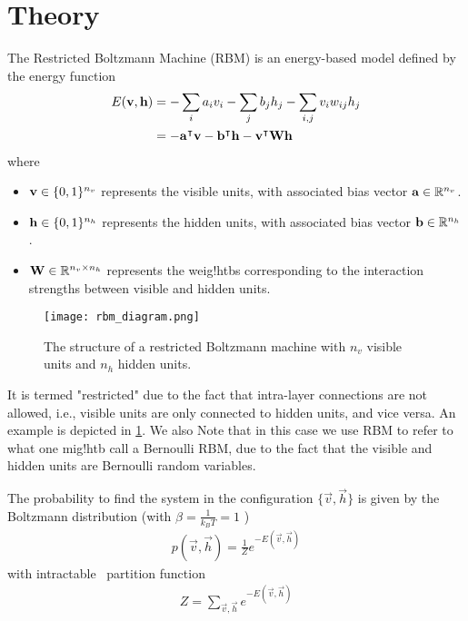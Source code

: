 \section{Theory}
The Restricted Boltzmann Machine (RBM) is an energy-based model defined by the energy function
\begin{align}
    E(\mathbf{v}, \mathbf{h})
        &= -\sum_i a_i v_i - \sum_j b_j h_j - \sum_{i,j} v_i w_{ij} h_j \label{eq:rbm_energy} \\
        &= -\mathbf{a}^\intercal\mathbf{v} - \mathbf{b}^\intercal\mathbf{h} - \mathbf{v}^\intercal\mathbf{W}\mathbf{h} \label{eq:rbm_energy_vectorized}
\end{align}
where
\begin{itemize}
    \item \( \mathbf{v} \in \{0,1\}^{n_v} \) represents the visible units, with associated bias vector \( \mathbf{a} \in \mathbb{R}^{n_v} \).
    \item \( \mathbf{h} \in \{0,1\}^{n_h} \) represents the hidden units, with associated bias vector \( \mathbf{b} \in \mathbb{R}^{n_h} \).
    \item \( \mathbf{W} \in \mathbb{R}^{n_v \times n_h} \) represents the weig!htbs corresponding to the interaction strengths between visible and hidden units.
\end{itemize}

\begin{figure}[!htb]
    \begin{center}
        \texttt{[image: rbm\_diagram.png]}
    \end{center}
    \caption{The structure of a restricted Boltzmann machine with \( n_v \) visible units and \( n_h \) hidden units.}
    \label{fig:rbm_diagram}
\end{figure}

It is termed "restricted" due to the fact that intra-layer connections are not allowed, i.e., visible units are only connected to hidden units, and vice versa.
An example is depicted in \cref{fig:rbm_diagram}.
We also Note that in this case we use RBM to refer to what one mig!htb call a Bernoulli RBM, due to the fact that the visible and hidden units are Bernoulli random variables.

The probability to find the system in the configuration \( \{\vec{v},\vec{h}\} \) is given by the Boltzmann distribution (with \( \beta = \frac{1}{k_BT} = 1 \) )
\begin{align}
    p(\vec{v}, \vec{h}) = \frac{1}{Z} e^{-E(\vec{v},\vec{h})}
\end{align}
with intractable~\cite{long_servedio_2010} partition function
\begin{align}
    Z = \sum_{\vec{v},\vec{h}} e^{-E(\vec{v},\vec{h})}
\end{align}

